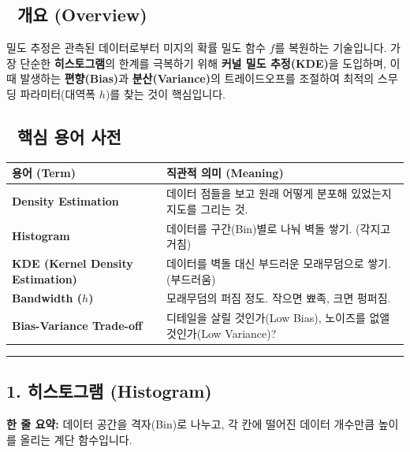 \documentclass[11pt,a4paper]{book}
\theoremstyle{definition}
\begin{document}
\subsection*{📌 개요 (Overview)}
밀도 추정은 관측된 데이터로부터 미지의 확률 밀도 함수 $f$를 복원하는 기술입니다. 가장 단순한 \textbf{히스토그램}의 한계를 극복하기 위해 \textbf{커널 밀도 추정(KDE)}을 도입하며, 이때 발생하는 \textbf{편향(Bias)}과 \textbf{분산(Variance)}의 트레이드오프를 조절하여 최적의 스무딩 파라미터(대역폭 $h$)를 찾는 것이 핵심입니다.

\subsection*{📝 핵심 용어 사전}
\begin{table}[h]
\centering
\begin{tabularx}{\textwidth}{|p{}|X|}
\hline
\textbf{용어 (Term)} & \textbf{직관적 의미 (Meaning)} \\
\hline
\textbf{Density Estimation} & 데이터 점들을 보고 원래 어떻게 분포해 있었는지 지도를 그리는 것. \\
\hline
\textbf{Histogram} & 데이터를 구간(Bin)별로 나눠 벽돌 쌓기. (각지고 거침) \\
\hline
\textbf{KDE (Kernel Density Estimation)} & 데이터를 벽돌 대신 부드러운 모래무덤으로 쌓기. (부드러움) \\
\hline
\textbf{Bandwidth ($h$)} & 모래무덤의 퍼짐 정도. 작으면 뾰족, 크면 펑퍼짐. \\
\hline
\textbf{Bias-Variance Trade-off} & 디테일을 살릴 것인가(Low Bias), 노이즈를 없앨 것인가(Low Variance)? \\
\hline
\end{tabularx}
\end{table}

\vspace{0.5cm}\hrule\vspace{0.5cm}

\subsection{1. 히스토그램 (Histogram)}

\begin{conceptbox}[title={개념 1: 디지털 모자이크}]
\textbf{한 줄 요약:} 데이터 공간을 격자(Bin)로 나누고, 각 칸에 떨어진 데이터 개수만큼 높이를 올리는 계단 함수입니다.
\end{conceptbox}
\end{document}
